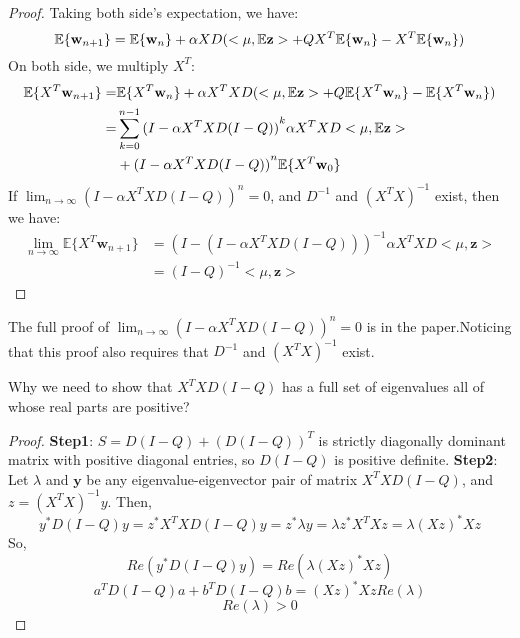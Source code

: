 \begin{proof}
    Taking both side's expectation, we have:
    \[
        \mathbb{E}\{\mathbf{w}_{n+1} \} = \mathbb{E} \{\mathbf{w}_n \}
        + \alpha X D(<\mu, \mathbb E \mathbf z> + QX^T\mathbb E\{\mathbf{w}_n\} 
        - X^T\mathbb E \mathbb\{\mathbf{w}_n\})
    \]
    On both side, we multiply $X^T$:
    \begin{align*}
        \label{eq:5}
        \mathbb{E}\{X^T\mathbf{w}_{n+1} \} =& \mathbb{E} \{X^T\mathbf{w}_n \}
        + \alpha X^T X D(<\mu, \mathbb E \mathbf z> + Q\mathbb E\{X^T\mathbf{w}_n\} 
        - \mathbb E \mathbb\{X^T\mathbf{w}_n\})\\
        =& \sum^{n-1}_{k=0} {(I - \alpha X^T XD(I-Q))}^k \alpha X^T XD
        <\mu, \mathbb E \mathbf z> \\
         & + {(I - \alpha X^T XD(I-Q))}^n \mathbb{E}\{X^T \mathbf w_0\}
    \end{align*}
    If $\lim_{n \to \infty} {(I- \alpha X^T X D(I-Q))}^n = 0$, 
    and $D^{-1}$ and ${(X^T X)}^{-1}$ exist, then we have:
    \begin{equation}
        \begin{aligned}
            \lim_{n \to \infty} \mathbb{E}\{X^T \mathbf{w}_{n+1} \} 
            &= {(I - (I-\alpha X^T XD(I-Q)))}^{-1} 
                \alpha X^T X D <\mu, \mathbf{z} > \\
           &= {(I - Q)}^{-1}<\mu,\mathbf{z}>
        \end{aligned}
    \end{equation}
\end{proof}

The full proof of $\lim_{n \to \infty} {(I- \alpha X^T X D(I-Q))}^n = 0$ is 
in the paper.Noticing that this proof also requires that
$D^{-1}$ and ${(X^T X)}^{-1}$ exist.

Why we need to show that $ X^T X D (I - Q) $ has a full set of eigenvalues
all of whose real parts are positive?
\begin{proof}
    \textbf{Step1}: $S = D(I-Q) + {(D(I-Q))}^T$ is strictly diagonally dominant matrix with positive diagonal entries, 
    so $ D(I-Q) $ is positive definite.
    \textbf{Step2}:
    Let $ \lambda $ and $ \textbf{y} $ be any eigenvalue-eigenvector pair of matrix $ X^T X D (I - Q) $,
    and $ z = {(X^T X)}^{-1} y $. Then,
    \[
        y^* D (I - Q) y = z^* X^T X D (I - Q) y 
        = z^* \lambda y = \lambda z^* X^T X z
        = \lambda {(Xz)}^* Xz
    \]
    So,
    \[
        Re(y^* D(I-Q) y) = Re(\lambda{(Xz)}^* Xz)
    \]
    \[
        a^T D (I - Q) a + b^T D (I - Q) b = {(Xz)}^* Xz Re(\lambda)
    \]
    \[
        Re(\lambda) > 0
    \]
\end{proof}

